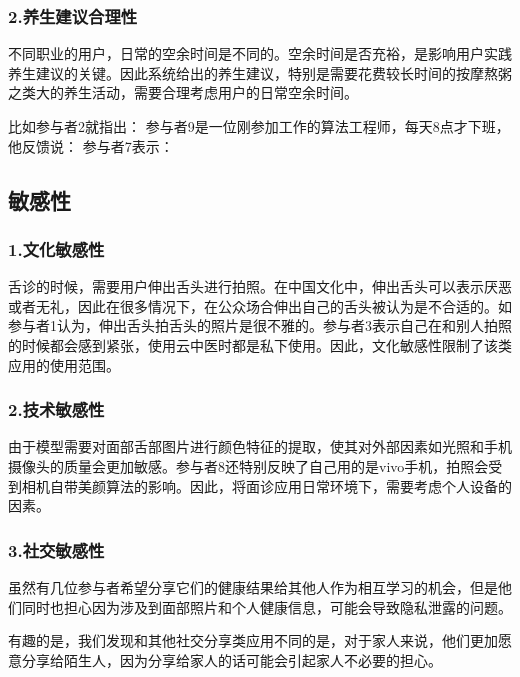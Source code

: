 \subsubsection{2.养生建议合理性}

不同职业的用户，日常的空余时间是不同的。空余时间是否充裕，是影响用户实践养生建议的关键。因此系统给出的养生建议，特别是需要花费较长时间的按摩熬粥之类大的养生活动，需要合理考虑用户的日常空余时间。

比如参与者2就指出：
参与者9是一位刚参加工作的算法工程师，每天8点才下班，他反馈说： 参与者7表示：

\subsection{敏感性}
\subsubsection{1.文化敏感性}

舌诊的时候，需要用户伸出舌头进行拍照。在中国文化中，伸出舌头可以表示厌恶或者无礼，因此在很多情况下，在公众场合伸出自己的舌头被认为是不合适的。如参与者1认为，伸出舌头拍舌头的照片是很不雅的。参与者3表示自己在和别人拍照的时候都会感到紧张，使用云中医时都是私下使用。因此，文化敏感性限制了该类应用的使用范围。

\subsubsection{2.技术敏感性}

由于模型需要对面部舌部图片进行颜色特征的提取，使其对外部因素如光照和手机摄像头的质量会更加敏感。参与者8还特别反映了自己用的是vivo手机，拍照会受到相机自带美颜算法的影响。因此，将面诊应用日常环境下，需要考虑个人设备的因素。

\subsubsection{3.社交敏感性}

虽然有几位参与者希望分享它们的健康结果给其他人作为相互学习的机会，但是他们同时也担心因为涉及到面部照片和个人健康信息，可能会导致隐私泄露的问题。


有趣的是，我们发现和其他社交分享类应用不同的是，对于家人来说，他们更加愿意分享给陌生人，因为分享给家人的话可能会引起家人不必要的担心。



